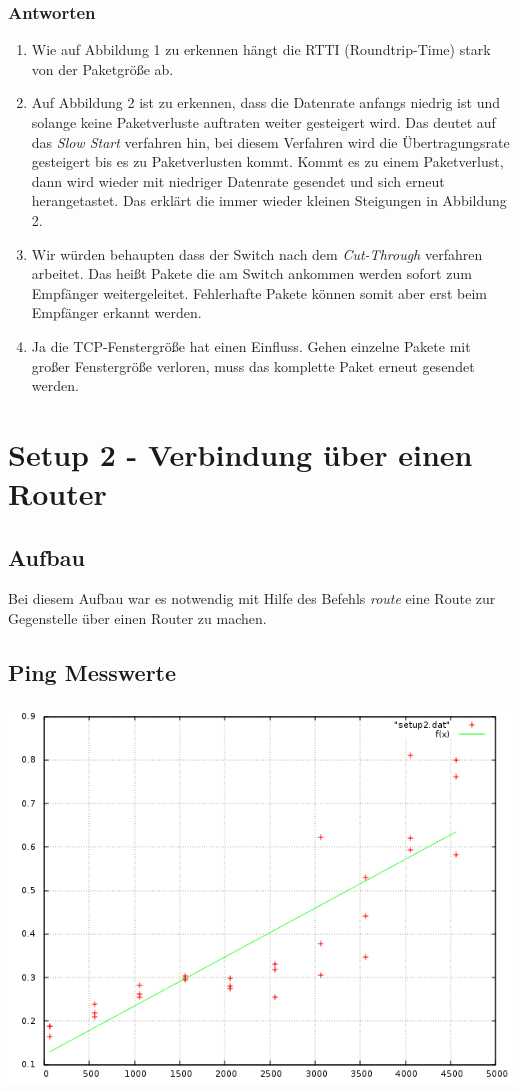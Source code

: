 \documentclass[a4paper,10pt]{article}
\begin{document}
\subsubsection{Antworten}
\begin{enumerate}
 \item Wie auf Abbildung 1 zu erkennen hängt die RTTI (Roundtrip-Time) stark von der Paketgröße ab.
 \item Auf Abbildung 2 ist zu erkennen, dass die Datenrate anfangs niedrig ist und solange keine
 Paketverluste auftraten weiter gesteigert wird. Das deutet auf das \textit{Slow Start} verfahren hin,
 bei diesem Verfahren wird die Übertragungsrate gesteigert bis es zu Paketverlusten kommt. Kommt es zu einem
 Paketverlust, dann wird wieder mit niedriger Datenrate gesendet und sich erneut herangetastet. Das erklärt
 die immer wieder kleinen Steigungen in Abbildung 2.
 \item Wir würden behaupten dass der Switch nach dem \textit{Cut-Through} verfahren arbeitet. Das heißt 
 Pakete die am Switch ankommen werden sofort zum Empfänger weitergeleitet. Fehlerhafte Pakete können somit
 aber erst beim Empfänger erkannt werden.
 \item Ja die TCP-Fenstergröße hat einen Einfluss. Gehen einzelne Pakete mit großer Fenstergröße verloren,
 muss das komplette Paket erneut gesendet werden.
\end{enumerate}


\section{Setup 2 - Verbindung über einen Router}

\subsection{Aufbau}
Bei diesem Aufbau war es notwendig mit Hilfe des Befehls \textit{route} eine Route zur Gegenstelle
über einen Router zu machen.

\subsection{Ping Messwerte}
\includegraphics[scale=0.75]{ping_setup2.png}
\end{document}
